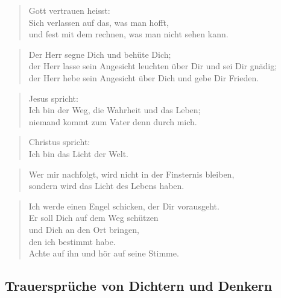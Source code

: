 \documentclass[ngerman,a4paper,11pt]{scrreprt}
\begin{document}
\begin{verse}
Gott vertrauen heisst: \\
Sich verlassen auf das, was man hofft, \\
und fest mit dem rechnen, was man nicht sehen kann. \\
\end{verse}

\begin{verse}
Der Herr segne Dich und behüte Dich; \\
der Herr lasse sein Angesicht leuchten über Dir und sei Dir gnädig; \\
der Herr hebe sein Angesicht über Dich und gebe Dir Frieden. \\
\end{verse}

\begin{verse}
Jesus spricht: \\
Ich bin der Weg, die Wahrheit und das Leben; \\
niemand kommt zum Vater denn durch mich. \\
\end{verse}

\begin{verse}
Christus spricht: \\
Ich bin das Licht der Welt. \\
\end{verse}

\begin{verse}
Wer mir nachfolgt, wird nicht in der Finsternis bleiben, \\
sondern wird das Licht des Lebens haben. \\
\end{verse}

\begin{verse}
Ich werde einen Engel schicken, der Dir vorausgeht. \\
Er soll Dich auf dem Weg schützen \\
und Dich an den Ort bringen, \\
den ich bestimmt habe. \\
Achte auf ihn und hör auf seine Stimme. \\
\end{verse}

\clearpage

\subsection{Trauersprüche von Dichtern und Denkern}
\label{sec-2-1-2-3}
\end{document}
